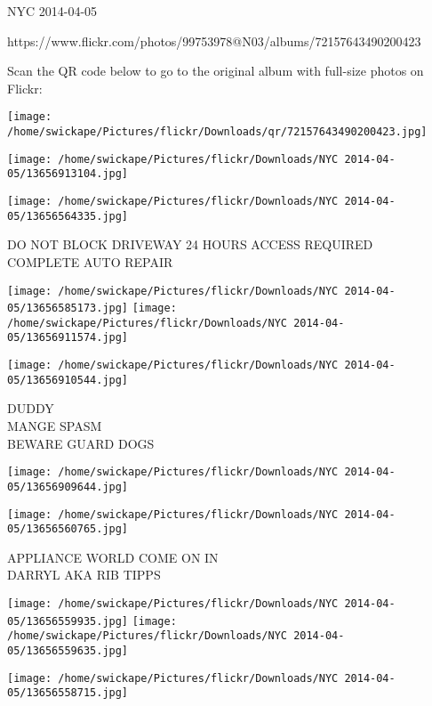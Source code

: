 \documentclass[10pt,letterpaper]{article}
\begin{document}
NYC 2014-04-05

https://www.flickr.com/photos/99753978@N03/albums/72157643490200423

Scan the QR code below to go to the original album with full-size photos on Flickr:

\texttt{[image: /home/swickape/Pictures/flickr/Downloads/qr/72157643490200423.jpg]}
\pagebreak

\texttt{[image: /home/swickape/Pictures/flickr/Downloads/NYC 2014-04-05/13656913104.jpg]}

\vspace{0.25in}
\texttt{[image: /home/swickape/Pictures/flickr/Downloads/NYC 2014-04-05/13656564335.jpg]}

DO NOT BLOCK DRIVEWAY 24 HOURS ACCESS REQUIRED\\
COMPLETE AUTO REPAIR\\
\pagebreak

\texttt{[image: /home/swickape/Pictures/flickr/Downloads/NYC 2014-04-05/13656585173.jpg]}
\texttt{[image: /home/swickape/Pictures/flickr/Downloads/NYC 2014-04-05/13656911574.jpg]}

\vspace{0.25in}
\texttt{[image: /home/swickape/Pictures/flickr/Downloads/NYC 2014-04-05/13656910544.jpg]}

DUDDY\\
MANGE SPASM\\
BEWARE GUARD DOGS\\
\pagebreak

\texttt{[image: /home/swickape/Pictures/flickr/Downloads/NYC 2014-04-05/13656909644.jpg]}

\vspace{0.25in}
\texttt{[image: /home/swickape/Pictures/flickr/Downloads/NYC 2014-04-05/13656560765.jpg]}

APPLIANCE WORLD COME ON IN\\
DARRYL AKA RIB TIPPS\\
\pagebreak

\texttt{[image: /home/swickape/Pictures/flickr/Downloads/NYC 2014-04-05/13656559935.jpg]}
\texttt{[image: /home/swickape/Pictures/flickr/Downloads/NYC 2014-04-05/13656559635.jpg]}

\vspace{0.25in}
\texttt{[image: /home/swickape/Pictures/flickr/Downloads/NYC 2014-04-05/13656558715.jpg]}
\end{document}
